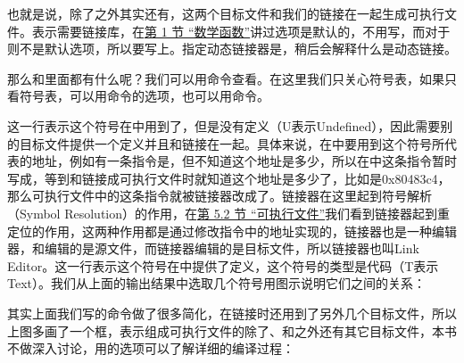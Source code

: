 

也就是说，除了之外其实还有，这两个目标文件和我们的链接在一起生成可执行文件。表示需要链接库，在\hyperlink{db.ch03s01.id2712397}{第 1 节 “数学函数”}讲过选项是默认的，不用写，而对于则不是默认选项，所以要写上。指定动态链接器是，稍后会解释什么是动态链接。



那么和里面都有什么呢？我们可以用命令查看。在这里我们只关心符号表，如果只看符号表，可以用命令的选项，也可以用命令。




这一行表示这个符号在中用到了，但是没有定义（U表示Undefined），因此需要别的目标文件提供一个定义并且和链接在一起。具体来说，在中要用到这个符号所代表的地址，例如有一条指令是，但不知道这个地址是多少，所以在中这条指令暂时写成，等到和链接成可执行文件时就知道这个地址是多少了，比如是0x80483c4，那么可执行文件中的这条指令就被链接器改成了。链接器在这里起到符号解析（Symbol Resolution）的作用，在\hyperlink{db.ch18s05.id2771639}{第 5.\BookSplit{}2 节 “可执行文件”}我们看到链接器起到重定位的作用，这两种作用都是通过修改指令中的地址实现的，链接器也是一种编辑器，和编辑的是源文件，而链接器编辑的是目标文件，所以链接器也叫Link Editor。这一行表示这个符号在中提供了定义，这个符号的类型是代码（T表示Text）。我们从上面的输出结果中选取几个符号用图示说明它们之间的关系：




其实上面我们写的命令做了很多简化，在链接时还用到了另外几个目标文件，所以上图多画了一个框，表示组成可执行文件的除了、和之外还有其它目标文件，本书不做深入讨论，用的选项可以了解详细的编译过程：


